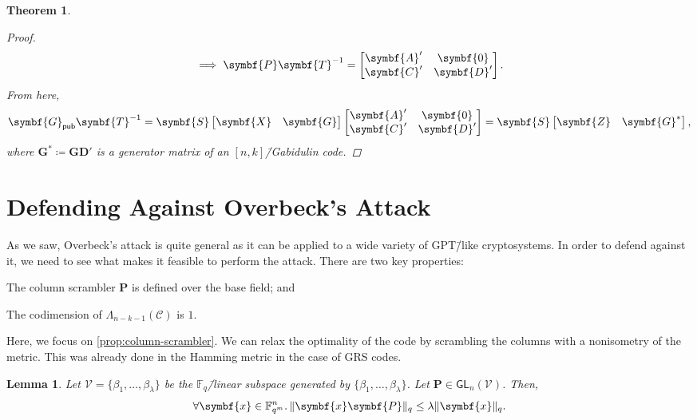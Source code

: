 \documentclass[version=last, paper=A4, parskip=half, oneside]{scrbook}
\theoremstyle{plain}
\newtheorem{theorem}{Theorem}
\newtheorem{lemma}{Lemma}
\theoremstyle{definition}
\theoremstyle{remark}
\renewcommand*{\vec}{\symbf}
\newcommand*{\mat}{\symbf}
\newcommand*{\GL}{\ensuremath{\mathsf{GL}}}
\newcommand*{\pub}{\ensuremath{\mathsf{pub}}}
\newcommand*{\FF}{\ensuremath{\mathbb{F}}}
\DeclarePairedDelimiter{\norm}{\lVert}{\rVert}
\newcommand*{\normR}[2]{\ensuremath{\norm{#1}_{#2}}}
\begin{document}
\begin{theorem}
\begin{proof}
\[      \implies
      \mat{P} \mat{T}^{-1} =
      \begin{bmatrix} \mat{A}' & \mat{0} \\ \mat{C}' & \mat{D}' \end{bmatrix}\text.
    \]
    From here,
    \[
      \mat{G}_{\pub} \mat{T}^{-1} =
      \mat{S}
      \begin{bmatrix} \mat{X} & \mat{G} \end{bmatrix}
      \begin{bmatrix} \mat{A}' & \mat{0} \\ \mat{C}' & \mat{D}' \end{bmatrix} =
      \mat{S}
      \begin{bmatrix} \mat{Z} & \mat{G}^* \end{bmatrix}\text,
    \]
    where \(\mat{G}^* \coloneqq \mat{G} \mat{D}'\) is a generator matrix of an
    \([n, k]\)\=/Gabidulin code.
  \end{proof}
\end{theorem}

\section{Defending Against Overbeck's Attack}

As we saw, Overbeck's attack is quite general as it can be applied to a wide
variety of GPT\=/like cryptosystems.  In order to defend against it, we need to
see what makes it feasible to perform the attack.  There are two key properties:
\begin{properties}
\item\label{prop:column-scrambler} The column scrambler \(\mat{P}\) is defined
  over the base field; and
\item\label{prop:codimension} The codimension of
  \(\Lambda_{n - k - 1}(\mathcal{C})\) is \(1\).
\end{properties}
Here, we focus on \cref{prop:column-scrambler}.  We can relax the optimality of
the code by scrambling the columns with a nonisometry of the metric.  This was
already done in the Hamming metric in the case of GRS codes.

\begin{lemma}\label{lem:rank-multiplication}
  Let \(\mathcal{V} = \{\beta_1, \ldots, \beta_{\lambda}\}\) be the
  \(\FF_q\)\=/linear subspace generated by
  \(\{\beta_1, \ldots, \beta_{\lambda}\}\).  Let
  \(\mat{P} \in \GL_n(\mathcal{V})\).  Then,
  \[
    \forall \vec{x} \in \FF_{q^m}^n\ldotp
    \normR{\vec{x} \mat{P}}{q} \le \lambda \normR{\vec{x}}{q}\text.
  \]
\end{lemma}
\end{document}
